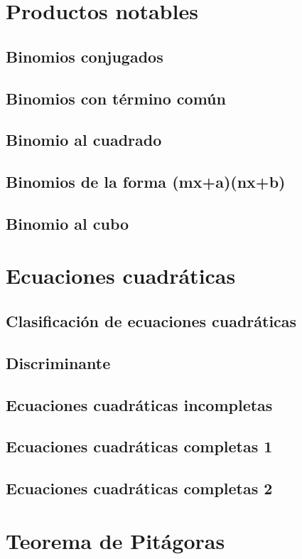 \documentclass[12pt,addpoints]{repaso}
\begin{document}
\begin{questions}
    \section*{   Productos notables}
    \subsection*{Binomios conjugados}
    \subsection*{Binomios con término común}
    \subsection*{Binomio al cuadrado}
    \subsection*{Binomios de la forma (mx+a)(nx+b)}
    \subsection*{Binomio al cubo}
    \section*{   Ecuaciones cuadráticas}
    \subsection*{Clasificación de ecuaciones cuadráticas}
    \subsection*{Discriminante}
    \subsection*{Ecuaciones cuadráticas incompletas}
    \subsection*{Ecuaciones cuadráticas completas 1}
    \subsection*{Ecuaciones cuadráticas completas 2}
    \section*{   Teorema de Pitágoras}

\end{questions}
\end{document}
